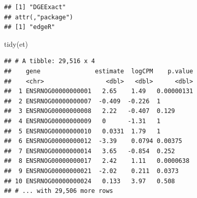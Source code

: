 \documentclass[]{tufte-book}
\newenvironment{Shaded}{}{}
\newcommand{\AttributeTok}[1]{\textcolor[rgb]{0.49,0.56,0.16}{#1}}
\newcommand{\DecValTok}[1]{\textcolor[rgb]{0.25,0.63,0.44}{#1}}
\newcommand{\DocumentationTok}[1]{\textcolor[rgb]{0.73,0.13,0.13}{\textit{#1}}}
\newcommand{\FunctionTok}[1]{\textcolor[rgb]{0.02,0.16,0.49}{#1}}
\newcommand{\NormalTok}[1]{#1}
\newcommand{\OtherTok}[1]{\textcolor[rgb]{0.00,0.44,0.13}{#1}}
\newcommand{\SpecialCharTok}[1]{\textcolor[rgb]{0.25,0.44,0.63}{#1}}
\begin{document}
\begin{Shaded}
\end{Shaded}

\begin{verbatim}
## [1] "DGEExact"
## attr(,"package")
## [1] "edgeR"
\end{verbatim}

\begin{Shaded}
\begin{Highlighting}[]
\FunctionTok{tidy}\NormalTok{(et)}
\end{Highlighting}
\end{Shaded}

\begin{verbatim}
## # A tibble: 29,516 x 4
##    gene               estimate  logCPM    p.value
##    <chr>                 <dbl>   <dbl>      <dbl>
##  1 ENSRNOG00000000001   2.65    1.49   0.00000131
##  2 ENSRNOG00000000007  -0.409  -0.226  1         
##  3 ENSRNOG00000000008   2.22   -0.407  0.129     
##  4 ENSRNOG00000000009   0      -1.31   1         
##  5 ENSRNOG00000000010   0.0331  1.79   1         
##  6 ENSRNOG00000000012  -3.39    0.0794 0.00375   
##  7 ENSRNOG00000000014   3.65   -0.854  0.252     
##  8 ENSRNOG00000000017   2.42    1.11   0.0000638 
##  9 ENSRNOG00000000021  -2.02    0.211  0.0373    
## 10 ENSRNOG00000000024   0.133   3.97   0.508     
## # ... with 29,506 more rows
\end{verbatim}
\end{document}
